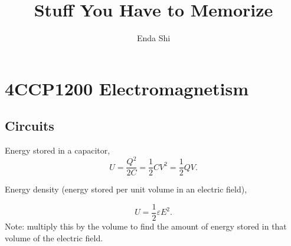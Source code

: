 \documentclass[10pt,oneside]{memoir}
\title{Stuff You Have to Memorize}
\author{Enda Shi}
\newcommand{\0}{\mathbf{0}}
\newcommand{\1}{\mathbf{1}}
\begin{document}
\projectfrontpage

\chapter{4CCP1200 Electromagnetism}

\section{Circuits}%
\label{sec:Circuits}

Energy stored in a capacitor,
\[
U = \frac{Q^2}{2C} = \frac{1}{2}CV^2 = \frac{1}{2}QV
.\] 

Energy density (energy stored per unit volume in an electric field),

\[
U = \frac{1}{2}\varepsilon E^2
.\] 
Note: multiply this by the volume to find the amount of energy stored in that volume of the electric field.
\end{document}
